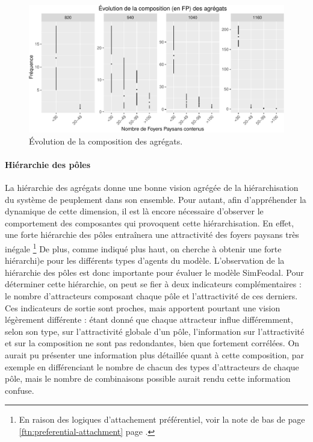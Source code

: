 \begin{figure}[H]
	\captionsetup{width=\linewidth}
	\includegraphics[width=.8\linewidth]{img/resultats/v0_compo_agregats.pdf}
	\caption{Évolution de la composition des agrégats.} 
	\label{fig:compo-agregats-v0} 
\end{figure}

\paragraph{Hiérarchie des pôles}

La hiérarchie des agrégats donne une bonne vision agrégée de la hiérarchisation du système de peuplement dans son ensemble. Pour autant, afin d'appréhender la dynamique de cette dimension, il est là encore nécessaire d'observer le comportement des composantes qui provoquent cette hiérarchisation. En effet, une forte hiérarchie des pôles entraînera une attractivité des foyers paysans très inégale \footnote{En raison des logiques d'attachement préférentiel, voir la note de bas de page \ref{ftn:preferential-attachment} page \pageref{ftn:preferential-attachment}.} De plus, comme indiqué plus haut, on cherche à obtenir une forte hiérarchi)e pour les différents types d'agents du modèle. L'observation de la hiérarchie des pôles est donc importante pour évaluer le modèle SimFeodal.
Pour déterminer cette hiérarchie, on peut se fier à deux indicateurs complémentaires : le nombre d'attracteurs composant chaque pôle et l'attractivité de ces derniers. Ces indicateurs de sortie sont proches, mais apportent pourtant une vision légèrement différente : étant donné que chaque attracteur influe différemment, selon son type, sur l'attractivité globale d'un pôle, l'information sur l'attractivité et sur la composition ne sont pas redondantes, bien que fortement corrélées. On aurait pu présenter une information plus détaillée quant à cette composition, par exemple en différenciant le nombre de chacun des types d'attracteurs de chaque pôle, mais le nombre de combinaisons possible aurait rendu cette information confuse.

